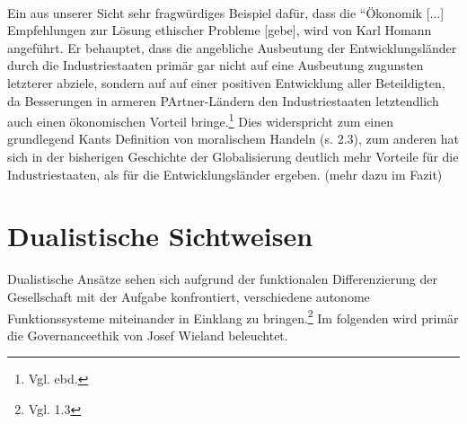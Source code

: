 \documentclass[12pt]{article}
\begin{document}
\\
Ein aus unserer Sicht sehr fragwürdiges Beispiel dafür, dass die “Ökonomik [...] Empfehlungen zur Lösung ethischer Probleme [gebe], wird von Karl Homann angeführt. Er behauptet, dass die angebliche Ausbeutung der Entwicklungsländer durch die Industriestaaten primär gar nicht auf eine Ausbeutung zugunsten letzterer abziele, sondern auf auf einer positiven Entwicklung aller Beteildigten, da Besserungen in armeren PArtner-Ländern den Industriestaaten letztendlich auch einen ökonomischen Vorteil bringe.\footnote{Vgl. ebd.} Dies widerspricht zum einen grundlegend Kants Definition von moralischem Handeln (s. 2.3), zum anderen hat sich in der bisherigen Geschichte der Globalisierung deutlich mehr Vorteile für die Industriestaaten, als für die Entwicklungsländer ergeben. (mehr dazu im Fazit)

\section{Dualistische Sichtweisen}
Dualistische Ansätze sehen sich aufgrund der funktionalen Differenzierung der Gesellschaft mit der Aufgabe konfrontiert, verschiedene autonome Funktionssysteme miteinander in Einklang zu bringen.\footnote{Vgl. 1.3} Im folgenden wird primär die Governanceethik von Josef Wieland beleuchtet.
\end{document}
